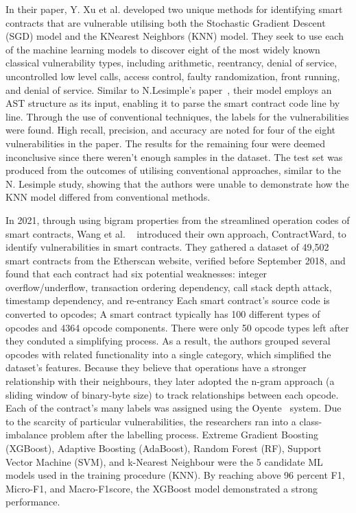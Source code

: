 In their paper, Y. Xu et al. developed two unique methods for identifying smart contracts that are vulnerable utilising both the Stochastic Gradient Descent (SGD) model and the KNearest Neighbors (KNN) model.
They seek to use each of the machine learning models to discover eight of the most widely known classical vulnerability types, including arithmetic, reentrancy, denial of service, uncontrolled low level calls, access control, faulty randomization, front running, and denial of service.
Similar to N.Lesimple's paper~\cite{he2019learning}, their model employs an AST structure as its input, enabling it to parse the smart contract code line by line.
Through the use of conventional techniques, the labels for the vulnerabilities were found.
High recall, precision, and accuracy are noted for four of the eight vulnerabilities in the paper.
The results for the remaining four were deemed inconclusive since there weren't enough samples in the dataset.
The test set was produced from the outcomes of utilising conventional approaches, similar to the N. Lesimple study, showing that the authors were unable to demonstrate how the KNN model differed from conventional methods.

In 2021, through using bigram properties from the streamlined operation codes of smart contracts, Wang et al. ~\cite{wang2020contractward} introduced their own approach, ContractWard, to identify vulnerabilities in smart contracts.
They gathered a dataset of 49,502 smart contracts from the Etherscan website, verified before September 2018, and found that each contract had six potential weaknesses:
integer overflow/underflow, transaction ordering dependency, call stack depth attack, timestamp dependency, and re-entrancy
Each smart contract's source code is converted to opcodes; A smart contract typically has 100 different types of opcodes and 4364 opcode components.
There were only 50 opcode types left after they conduted a simplifying process.
As a result, the authors grouped several opcodes with related functionality into a single category, which simplified the dataset's features.
Because they believe that operations have a stronger relationship with their neighbours, they later adopted the n-gram approach (a sliding window of binary-byte size) to track relationships between each opcode.
Each of the contract's many labels was assigned using the Oyente~\cite{oyente} system.
Due to the scarcity of particular vulnerabilities, the researchers ran into a class-imbalance problem after the labelling process.
Extreme Gradient Boosting (XGBoost), Adaptive Boosting (AdaBoost), Random Forest (RF), Support Vector Machine (SVM), and k-Nearest Neighbour were the 5 candidate ML models used in the training procedure (KNN).
By reaching above 96 percent F1, Micro-F1, and Macro-F1score, the XGBoost model demonstrated a strong performance.

